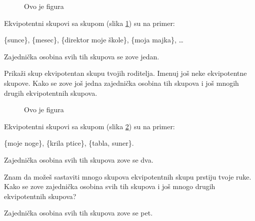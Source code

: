         \begin{figure}[h]

          \center


         \caption{Ovo je figura}\label{slika2str30}

        \end{figure} 



        Ekvipotentni skupovi sa skupom (slika \ref{slika2str30}) su na primer:



        

        \{sunce\}, \{mesec\}, \{direktor moje \v skole\}, \{moja majka\}, \ldots





        Zajedni\v cka osobina svih tih skupova se zove jedan.

        \begin{zad}

            Prika\v zi skup ekvipotentan skupu tvojih roditelja. Imenuj jo\v s neke ekvipotentne skupove. Kako se zove jo\v s jedna zajedni\v cka osobina tih skupova i jo\v s mnogih drugih ekvipotentnih skupova.

        \end{zad}

              \begin{figure}[h]

          \center


         \caption{Ovo je figura}\label{slika1str31}

        \end{figure} 



        Ekvipotentni skupovi sa skupom (slika \ref{slika1str31}) su na primer:



        

         \{moje noge\}, \{krila ptice\}, \{tabla, sun\dj er\}.



        Zajedni\v cka osobina svih tih skupova zove se dva.

   \begin{zad}

       Znam da mo\v ze\v s sastaviti mnogo skupova ekvipotentnih skupu prstiju tvoje ruke. Kako se zove zajedni\v cka osobina svih tih skupova i jo\v s mnogo drugih ekvipotentnih skupova?



       Zajedni\v cka osobina svih tih skupova zove se pet.

   \end{zad}

     

